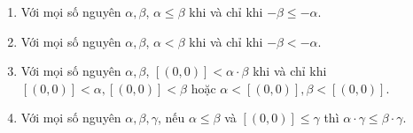 \begin{theorem}\label{theorem:integers-order-and-operations-sequel}
    \begin{enumerate}[label={(\roman*)}]
        \item Với mọi số nguyên $\alpha, \beta$, $\alpha\leq \beta$ khi và chỉ khi $-\beta\leq-\alpha$.
        \item Với mọi số nguyên $\alpha, \beta$, $\alpha < \beta$ khi và chỉ khi $-\beta < -\alpha$.
        \item Với mọi số nguyên $\alpha, \beta$, $[(0,0)] < \alpha\cdot \beta$ khi và chỉ khi $[(0,0)] < \alpha, [(0,0)] < \beta$ hoặc $\alpha < [(0,0)], \beta < [(0,0)]$.
        \item Với mọi số nguyên $\alpha, \beta, \gamma$, nếu $\alpha\leq\beta$ và $[(0,0)]\leq\gamma$ thì $\alpha\cdot\gamma \leq \beta\cdot\gamma$.
    \end{enumerate}
\end{theorem}

